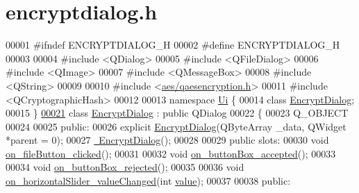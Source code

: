 \hypertarget{encryptdialog_8h_source}{}\section{encryptdialog.\+h}
\label{encryptdialog_8h_source}

\begin{DoxyCode}
00001 \textcolor{preprocessor}{#ifndef ENCRYPTDIALOG\_H}
00002 \textcolor{preprocessor}{#define ENCRYPTDIALOG\_H}
00003 
00004 \textcolor{preprocessor}{#include <QDialog>}
00005 \textcolor{preprocessor}{#include <QFileDialog>}
00006 \textcolor{preprocessor}{#include <QImage>}
00007 \textcolor{preprocessor}{#include <QMessageBox>}
00008 \textcolor{preprocessor}{#include <QString>}
00009 
00010 \textcolor{preprocessor}{#include <\mbox{\hyperlink{qaesencryption_8h}{aes/qaesencryption.h}}>}
00011 \textcolor{preprocessor}{#include <QCryptographicHash>}
00012 
00013 \textcolor{keyword}{namespace }\mbox{\hyperlink{namespace_ui}{Ui}} \{
00014 \textcolor{keyword}{class }\mbox{\hyperlink{class_encrypt_dialog}{EncryptDialog}};
00015 \}
\mbox{\hyperlink{class_encrypt_dialog}{00021}} \textcolor{keyword}{class }\mbox{\hyperlink{class_encrypt_dialog}{EncryptDialog}} : \textcolor{keyword}{public} QDialog
00022 \{
00023     Q\_OBJECT
00024 
00025 \textcolor{keyword}{public}:
00026     \textcolor{keyword}{explicit} \mbox{\hyperlink{class_encrypt_dialog_ab57e8b3a0d00c977e81f3b356657524e}{EncryptDialog}}(QByteArray \_data, QWidget *parent = 0);
00027     \mbox{\hyperlink{class_encrypt_dialog_a466e283080f87ee50f172052e43e38b6}{~EncryptDialog}}();
00028 
00029 \textcolor{keyword}{public} slots:
00030     \textcolor{keywordtype}{void} \mbox{\hyperlink{class_encrypt_dialog_ac9817d3f11f44f4bb8d97a228fbdf8a5}{on\_fileButton\_clicked}}();
00031 
00032     \textcolor{keywordtype}{void} \mbox{\hyperlink{class_encrypt_dialog_a9a998acd37db458eede31f4a9cb16b78}{on\_buttonBox\_accepted}}();
00033 
00034     \textcolor{keywordtype}{void} \mbox{\hyperlink{class_encrypt_dialog_a43deb5fd2be501f4d03582a8ed49e9c2}{on\_buttonBox\_rejected}}();
00035 
00036     \textcolor{keywordtype}{void} \mbox{\hyperlink{class_encrypt_dialog_a48c33063066fdbd61e2c87f08a5cfd60}{on\_horizontalSlider\_valueChanged}}(\textcolor{keywordtype}{int} 
      \mbox{\hyperlink{namespace_errors_dict_setup_a4436d6af623cbe45d37493afe4de9461}{value}});
00037 
00038 \textcolor{keyword}{public}:

\end{DoxyCode}

